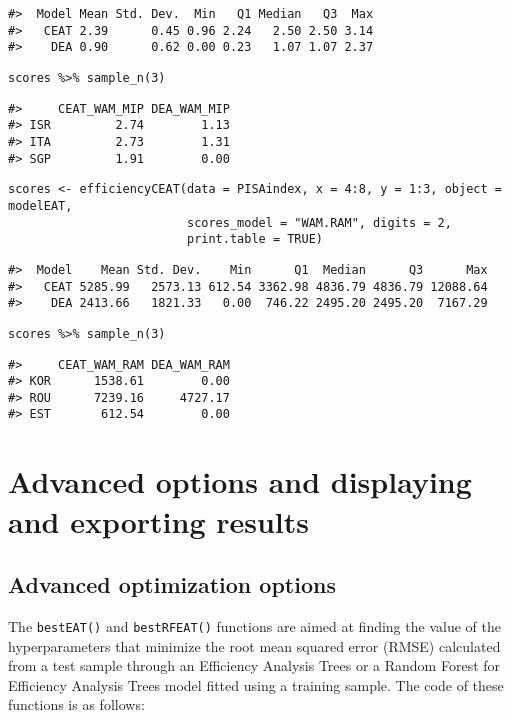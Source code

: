 \begin{verbatim}
#>  Model Mean Std. Dev.  Min   Q1 Median   Q3  Max
#>   CEAT 2.39      0.45 0.96 2.24   2.50 2.50 3.14
#>    DEA 0.90      0.62 0.00 0.23   1.07 1.07 2.37
\end{verbatim}

\begin{verbatim}
scores %>% sample_n(3)
\end{verbatim}

\begin{verbatim}
#>     CEAT_WAM_MIP DEA_WAM_MIP
#> ISR         2.74        1.13
#> ITA         2.73        1.31
#> SGP         1.91        0.00
\end{verbatim}

\begin{verbatim}
scores <- efficiencyCEAT(data = PISAindex, x = 4:8, y = 1:3, object = modelEAT,
                         scores_model = "WAM.RAM", digits = 2,
                         print.table = TRUE)
\end{verbatim}

\begin{verbatim}
#>  Model    Mean Std. Dev.    Min      Q1  Median      Q3      Max
#>   CEAT 5285.99   2573.13 612.54 3362.98 4836.79 4836.79 12088.64
#>    DEA 2413.66   1821.33   0.00  746.22 2495.20 2495.20  7167.29
\end{verbatim}

\begin{verbatim}
scores %>% sample_n(3)
\end{verbatim}

\begin{verbatim}
#>     CEAT_WAM_RAM DEA_WAM_RAM
#> KOR      1538.61        0.00
#> ROU      7239.16     4727.17
#> EST       612.54        0.00
\end{verbatim}

\hypertarget{section6}{%
\section{Advanced options and displaying and exporting results}\label{section6}}

\hypertarget{advanced-optimization-options}{%
\subsection{Advanced optimization options}\label{advanced-optimization-options}}

The \texttt{bestEAT()} and \texttt{bestRFEAT()} functions are aimed at finding the value of the hyperparameters that minimize the root mean squared error (RMSE) calculated from a test sample through an Efficiency Analysis Trees or a Random Forest for Efficiency Analysis Trees model fitted using a training sample. The code of these functions is as follows:

